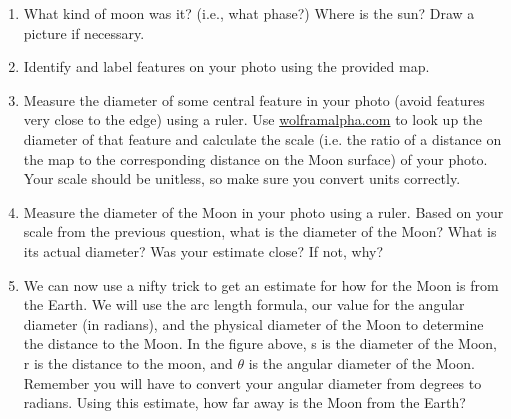 \documentclass[12pt]{article}%
\begin{document}
\begin{enumerate}
    \item What kind of moon was it? (i.e., what phase?)
    Where is the sun? Draw a picture if necessary.
    
    
    \item Identify and label features on your photo using the provided map.
    
    \item Measure the diameter of some central feature in your photo (avoid features very close to the edge) using a ruler. Use \url{wolframalpha.com} to look up the diameter of that feature and calculate the scale (i.e. the ratio of a distance on the map to the corresponding distance on the Moon surface) of your photo. Your scale should be unitless, so make sure you convert units correctly. 
    
    \item Measure the diameter of the Moon in your photo using a ruler. Based on your scale from the previous question, what is the diameter of the Moon? What is its actual diameter? Was your estimate close? If not, why?
    
    \item We can now use a nifty trick to get an estimate for how for the Moon is from the Earth. We will use the arc length formula, our value for the angular diameter (in radians), and the physical diameter of the Moon to determine the distance to the Moon. In the figure above, s is the diameter of the Moon, r is the distance to the moon, and $\theta$ is the angular diameter of the Moon. Remember you will have to convert your angular diameter from degrees to radians. Using this estimate, how far away is the Moon from the Earth? 
    


\end{enumerate}
\end{document}
